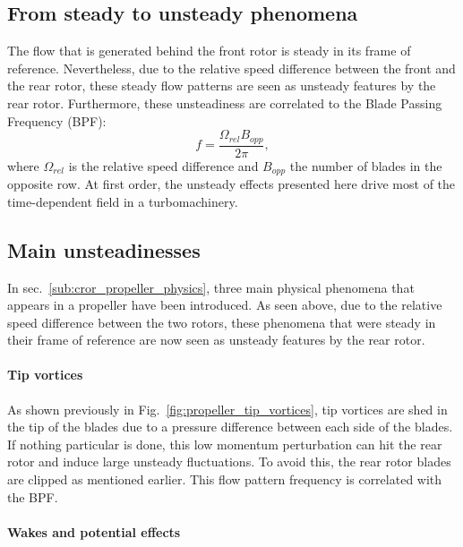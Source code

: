 
\subsection{From steady to unsteady phenomena}
\label{sub:cror_from_steady_to_unsteady_phenomena}

The flow that is generated behind the front rotor
is steady in its frame of reference. Nevertheless,
due to the relative speed difference between the
front and the rear rotor, these steady flow patterns are
seen as unsteady features by the rear rotor. Furthermore,
these unsteadiness are correlated to the Blade Passing Frequency (BPF):
\begin{equation}
	f = \frac{\Omega_{rel} B_{opp}}{2 \pi},
\end{equation}
where $\Omega_{rel}$ is the relative speed difference 
and $B_{opp}$ the number of blades in the opposite row.
At first order, the unsteady effects presented here drive
most of the time-dependent field in a turbomachinery.

\subsection{Main unsteadinesses}
\label{sub:cror_main_unsteadinesses}

In sec.~\ref{sub:cror_propeller_physics}, three main physical phenomena
that appears in a propeller have been introduced. As seen above, due to
the relative speed difference between the two rotors, these phenomena
that were steady in their frame of reference are now seen as unsteady features
by the rear rotor.

\paragraph{Tip vortices}

As shown previously in Fig.~\ref{fig:propeller_tip_vortices}, tip vortices are shed in the
tip of the blades due to a pressure difference between each side of the blades.
If nothing particular is done, this low momentum perturbation can
hit the rear rotor and induce large unsteady fluctuations. To avoid this,
the rear rotor blades are clipped as mentioned earlier. This flow pattern
frequency is correlated with the BPF.

\paragraph{Wakes and potential effects}

